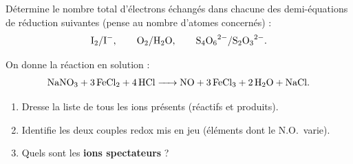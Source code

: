 \documentclass[11pt,a4paper]{article}
\newcommand{\NO}{\ensuremath{\mathrm{N.O.}}}
\newcounter{exo}
\begin{document}
\begin{exo}
Détermine le nombre total d'électrons échangés dans chacune des demi-équations de réduction
suivantes (pense au nombre d'atomes concernés) :
\[
\ce{I2}/\ce{I^-},\qquad \ce{O2}/\ce{H2O},\qquad \ce{S4O6^{2-}}/\ce{S2O3^{2-}}.
\]
\end{exo}

\begin{exo}
On donne la réaction en solution :
\[
\ce{NaNO3 + 3 FeCl2 + 4 HCl -> NO + 3 FeCl3 + 2 H2O + NaCl}.
\]
\begin{enumerate}[label=(\alph*),leftmargin=2em,topsep=1pt,itemsep=1pt]
  \item Dresse la liste de tous les ions présents (réactifs et produits).
  \item Identifie les deux couples redox mis en jeu (éléments dont le \NO\ varie).
  \item Quels sont les \textbf{ions spectateurs} ?
\end{enumerate}
\end{exo}
\end{document}
